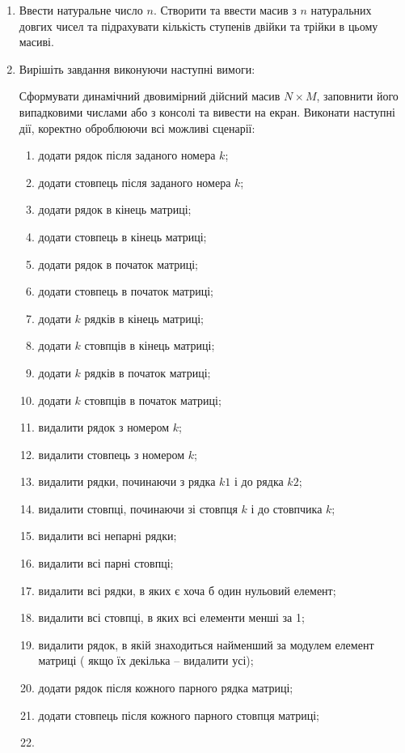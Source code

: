 \documentclass[a5paper,titlepage,openany,twoside,
]
{book_unv}%
\makeatletter
\newcommand{\xslalph}[1]{\expandafter\@xslalph\csname c@#1\endcsname}
\newcommand{\@xslalph}[1]{%
    \ifcase#1\or а\or б\or в\or г\or д\or e\or є\or ж\or з\or i%
    \or й\or к\or л\or м\or н\or о\or п\or р\or с\or т%
    \or у\or ф\or х\or ц\or ч\or ш\or ю\or я\or аа\or бб\or вв%
    \else\@ctrerr\fi%
}
\makeatother
\begin{document}
\begin{enumerate}
\begin{enumerate}
\item
  Ввести натуральне число $n$. Створити та ввести масив з $n$ натуральних
 довгих чисел та підрахувати кількість ступенів двійки та трійки в цьому масиві.
\item
  Вирішіть завдання виконуючи наступні вимоги:

Сформувати динамічний двовимірний дійсний масив $N \times M$, заповнити його випадковими
числами або з консолі та вивести на екран. Виконати наступні дії, коректно оброблюючи 
всі можливі сценарії:

\begin{enumerate}[label=\xslalph*)]
\item
  додати рядок після заданого номера $k$;
\item
  додати стовпець після заданого номера $k$;
\item
  додати рядок в кінець матриці;
\item
  додати стовпець в кінець матриці;
\item
  додати рядок в початок матриці;
\item
  додати стовпець в початок матриці;
\item
  додати $k$ рядків в кінець матриці;
\item
  додати $k$ стовпців в кінець матриці;
\item
  додати $k$ рядків в початок матриці;
\item
  додати $k$ стовпців в початок матриці;
\item
  видалити рядок з номером $k$;
\item
  видалити стовпець з номером $k$;
\item
  видалити рядки, починаючи з рядка $k1$ і до рядка $k2$;
\item
  видалити стовпці, починаючи зі стовпця $k$ і до стовпчика $k$;
\item
  видалити всі непарні рядки;
\item
  видалити всі парні стовпці;
\item
  видалити всі рядки, в яких є хоча б один нульовий елемент;
\item
  видалити всі стовпці, в яких всі елементи менші за 1;
\item
  видалити рядок, в якій знаходиться найменший за модулем елемент матриці (
якщо їх декілька -- видалити усі);
\item
  додати рядок після кожного парного рядка матриці;
\item
  додати стовпець після кожного парного стовпця матриці;
\item

\end{enumerate}
\end{enumerate}
\end{enumerate}
\end{document}
